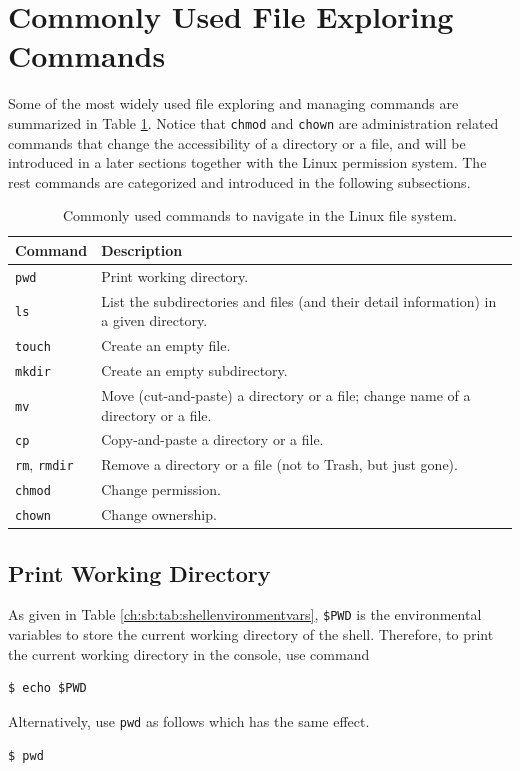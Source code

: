 \section{Commonly Used File Exploring Commands} \label{ch:fm:sec:filemanagement}

Some of the most widely used file exploring and managing commands are summarized in Table \ref{ch:fm:tab:commonfilecommands}. Notice that \verb|chmod| and \verb|chown| are administration related commands that change the accessibility of a directory or a file, and will be introduced in a later sections together with the Linux permission system. The rest commands are categorized and introduced in the following subsections.

\begin{table}[!htb]
  \centering \caption{Commonly used commands to navigate in the Linux file system.}\label{ch:fm:tab:commonfilecommands}
  \begin{tabularx}{\textwidth}{lX}
    \hline
    Command & Description \\ \hline
    \verb|pwd| & Print working directory. \\ 
    \verb|ls| & List the subdirectories and files (and their detail information) in a given directory. \\ 
    \verb|touch| & Create an empty file. \\ 
    \verb|mkdir| & Create an empty subdirectory. \\ 
    \verb|mv| & Move (cut-and-paste) a directory or a file; change name of a directory or a file. \\ 
    \verb|cp| & Copy-and-paste a directory or a file. \\ 
    \verb|rm|, \verb|rmdir| & Remove a directory or a file (not to Trash, but just gone). \\ 
    \verb|chmod| & Change permission. \\ 
    \verb|chown| & Change ownership. \\
    \hline
  \end{tabularx}
\end{table}

\subsection{Print Working Directory}

As given in Table \ref{ch:sb:tab:shellenvironmentvars}, \verb|$PWD| is the environmental variables to store the current working directory of the shell. Therefore, to print the current working directory in the console, use command 
\begin{lstlisting}
$ echo $PWD
\end{lstlisting}
Alternatively, use \verb|pwd| as follows which has the same effect.
\begin{lstlisting}
$ pwd
\end{lstlisting}

